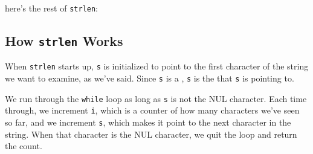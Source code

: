 \begin{flushleft}
\verb% int strlen(char *s)% \\*
\end{flushleft}

here's the rest of {\tt strlen}:

\begin{flushleft}
\verb% int strlen(char *s)% \\*
\verb% { % \\*
\verb%   int i = 0; % \\*
\verb%  % \\*
\verb%   while (*s != '\0') { % \\*
\verb%     i++; % \\*
\verb%     s++;      /*% Make $s$ point to the next character \verb%*/ % \\*
\verb%   } % \\*
\verb%  % \\*
\verb%   return i; % \\*
\verb% } % 
\end{flushleft}

\subsection{How {\tt strlen} Works}

When {\tt strlen} starts up, {\tt s} is initialized to point to the
first character of the string we want to examine, as we've said.
Since {\tt s} is a \Char, {\tt *s} is the \chr that {\tt s} is
pointing to.  

We run through the {\tt while} loop as long as {\tt *s} is not the NUL
character.  Each time through, we increment {\tt i}, which is a counter
of how many characters we've seen so far, and we increment {\tt s},
which makes it point to the next character in the string.  When that
character is the NUL character, we quit the loop and return the count.

